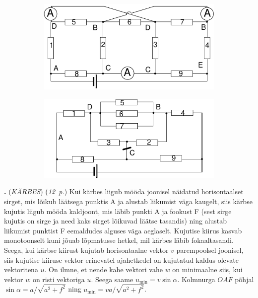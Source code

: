 \documentclass[12pt,a5paper]{article}
\newcommand{\numb}[1]{\vspace{5pt}\textbf{\large #1}}
\newcommand{\nimi}[1]{(\textsl{\small #1})}
\newcommand{\punktid}[1]{(\emph{#1~p.})}
\newcounter{ylesanne}
\newcommand{\yl}[1]{\addtocounter{ylesanne}{1}\numb{\theylesanne.} \nimi{#1} \newblock{}}
\begin{document}
\begin{figure}[h]
    \centering
    \begin{subfigure}[h]{0.45\textwidth}
     \includegraphics[width=\textwidth]{3ruutlah-a.pdf}\\
    \end{subfigure}
    \begin{subfigure}[h]{0.45\textwidth}
    \vspace{-10pt}
     \includegraphics[width=\textwidth]{3ruutlah-b.pdf}
    \end{subfigure}
 \end{figure}

\newpage


\yl{KÄRBES} \punktid{12} Kui kärbes liigub mööda joonisel näidatud horisontaalset sirget, mis lõikub läätsega punktis A ja alustab liikumist väga kaugelt, siis kärbse kujutis liigub mööda kaldjoont, mis läbib punkti A ja fookust F (sest sirge kujutis on sirge ja need kaks sirget lõikuvad läätse tasandis) ning alustab liikumist punktist F eemaldudes alguses väga aeglaselt. Kujutise kiirus kasvab monotoonselt kuni jõuab lõpmatusse hetkel, mil kärbes läbib fokaaltasandi. Seega, kui kärbse kiirust kujutab horisontaalne vektor $v$ parempoolsel joonisel, siis kujutise kiiruse vektor erinevatel ajahetkedel on kujutatud kaldus olevate vektoritena $u$. On ilmne, et nende kahe vektori vahe $w$ on minimaalne siis, kui vektor $w$ on risti vektoriga $u$. Seega saame $u_{\min}=v\sin\alpha$. Kolmnurga $OAF$ põhjal $\sin\alpha=a/\sqrt{a^2+f^2}$ ning $u_{\min}=va/\sqrt{a^2+f^2}$.\\
\end{document}

